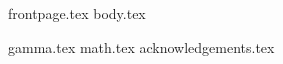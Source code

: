 \documentclass[runningheads]{llncs}
\begin{document}
{frontpage.tex}
{body.tex}

\iflncs
  
\fi
\ifoakland
  
\fi
\ifccs
  
\fi


\appendix

{gamma.tex}
{math.tex}
\ifanonymous
\else
  {acknowledgements.tex}
\fi
\end{document}
